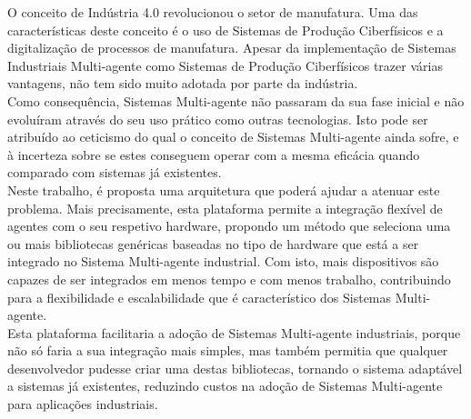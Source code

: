 
%

O conceito de Indústria 4.0 revolucionou o setor de manufatura. Uma das características deste conceito é o uso de Sistemas de Produção Ciberfísicos e a digitalização de processos de manufatura. Apesar da implementação de Sistemas Industriais Multi-agente como Sistemas de Produção Ciberfísicos trazer várias vantagens, não tem sido muito adotada por parte da indústria.\\

Como consequência, Sistemas Multi-agente não passaram da sua fase inicial e não evoluíram através do seu uso prático como outras tecnologias. Isto pode ser atribuído ao ceticismo do qual o conceito de Sistemas Multi-agente ainda sofre, e à incerteza sobre se estes conseguem operar com a mesma eficácia quando comparado com sistemas já existentes.\\

Neste trabalho, é proposta uma arquitetura que poderá ajudar a atenuar este problema. Mais precisamente, esta plataforma permite a integração flexível de agentes com o seu respetivo hardware, propondo um método que seleciona uma ou mais bibliotecas genéricas baseadas no tipo de hardware que está a ser integrado no Sistema Multi-agente industrial. Com isto, mais dispositivos são capazes de ser integrados em menos tempo e com menos trabalho, contribuindo para a flexibilidade e escalabilidade que é característico dos Sistemas Multi-agente.\\

Esta plataforma facilitaria a adoção de Sistemas Multi-agente industriais, porque não só faria a sua integração mais simples, mas também permitia que qualquer desenvolvedor pudesse criar uma destas bibliotecas, tornando o sistema adaptável a sistemas já existentes, reduzindo custos na adoção de Sistemas Multi-agente para aplicações industriais.\\

%
%

